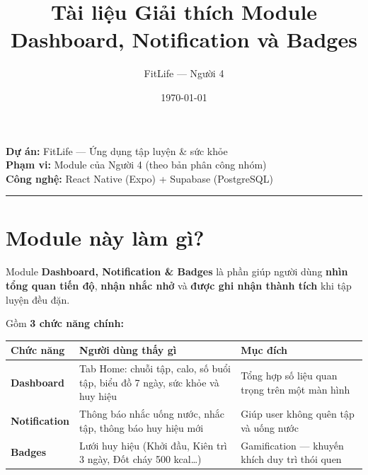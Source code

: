 \documentclass[12pt,a4paper]{article}
\title{Tài liệu Giải thích Module Dashboard, Notification và Badges}
\author{FitLife --- Người 4}
\date{\today}
\newcounter{none}
\begin{document}
\maketitle
\tableofcontents
\newpage

\textbf{Dự án:} FitLife --- Ứng dụng tập luyện \& sức khỏe\\
\textbf{Phạm vi:} Module của Người 4 (theo bản phân công nhóm)\\
\textbf{Công nghệ:} React Native (Expo) + Supabase (PostgreSQL)

\begin{center}\rule{0.5\linewidth}{0.5pt}\end{center}

\section{Module này làm gì?}\label{module-nuxe0y-luxe0m-guxec}

Module \textbf{Dashboard, Notification \& Badges} là phần giúp người
dùng \textbf{nhìn tổng quan tiến độ}, \textbf{nhận nhắc nhở} và
\textbf{được ghi nhận thành tích} khi tập luyện đều đặn.

Gồm \textbf{3 chức năng chính:}

{\def\LTcaptype{none} %
\begin{longtable}[]{@{}
  >{\raggedright\arraybackslash}p{}
  >{\raggedright\arraybackslash}p{}
  >{\raggedright\arraybackslash}p{}@{}}
\toprule\noalign{}
\begin{minipage}[b]{\linewidth}\raggedright
Chức năng
\end{minipage} & \begin{minipage}[b]{\linewidth}\raggedright
Người dùng thấy gì
\end{minipage} & \begin{minipage}[b]{\linewidth}\raggedright
Mục đích
\end{minipage} \\
\midrule\noalign{}
\endhead
\bottomrule\noalign{}
\endlastfoot
\textbf{Dashboard} & Tab Home: chuỗi tập, calo, số buổi tập, biểu đồ 7
ngày, sức khỏe và huy hiệu & Tổng hợp số liệu quan trọng trên một màn
hình \\
\textbf{Notification} & Thông báo nhắc uống nước, nhắc tập, thông báo
huy hiệu mới & Giúp user không quên tập và uống nước \\
\textbf{Badges} & Lưới huy hiệu (Khởi đầu, Kiên trì 3 ngày, Đốt cháy 500
kcal\ldots) & Gamification --- khuyến khích duy trì thói quen \\
\end{longtable}
}
\end{document}
